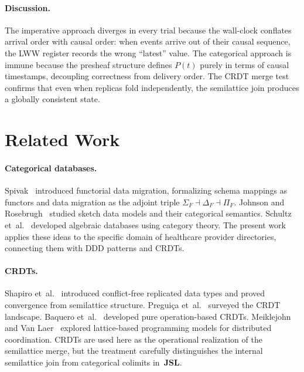 \documentclass[11pt,a4paper]{article}
\begin{document}
\paragraph{Discussion.}
The imperative approach diverges in every trial because the wall-clock
conflates arrival order with causal order: when events arrive out of
their causal sequence, the LWW register records the wrong ``latest''
value. The categorical approach is immune because the presheaf
structure defines $P(t)$ purely in terms of causal timestamps,
decoupling correctness from delivery order. The CRDT merge test
confirms that even when replicas fold independently, the semilattice
join produces a globally consistent state.

\section{Related Work}
\label{sec:related-work}

\paragraph{Categorical databases.}
Spivak~\citep{spivak2012,spivak2014} introduced functorial data migration,
formalizing schema mappings as functors and data migration as the adjoint
triple $\Sigma_F\dashv\Delta_F\dashv\Pi_F$. Johnson and
Rosebrugh~\citep{johnsonrosebrugh2002} studied sketch data models and
their categorical semantics. Schultz et~al.~\citep{schultz2017} developed
algebraic databases using category theory. The present work applies these ideas to
the specific domain of healthcare provider directories, connecting them
with DDD patterns and CRDTs.

\paragraph{CRDTs.}
Shapiro et~al.~\citep{shapiro2011} introduced conflict-free replicated
data types and proved convergence from semilattice structure.
Pregui\c{c}a et~al.~\citep{preguica2018} surveyed the CRDT landscape.
Baquero et~al.~\citep{baquero2017} developed pure operation-based CRDTs.
Meiklejohn and Van Laer~\citep{meiklejohn2015} explored lattice-based
programming models for distributed coordination. CRDTs are used here as the
operational realization of the semilattice merge, but the treatment carefully
distinguishes the internal semilattice join from categorical colimits
in~$\mathbf{JSL}$.
\end{document}
